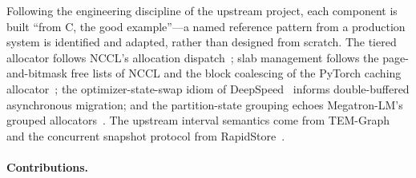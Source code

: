 \documentclass[10pt]{article}
\theoremstyle{definition}
\begin{document}
Following the engineering discipline of the upstream project, each component is
built ``from C, the good example''---a named reference pattern from a
production system is identified and adapted, rather than designed from
scratch. The tiered allocator follows NCCL's allocation dispatch~\citep{nccl};
slab management follows the page-and-bitmask free lists of NCCL and the block
coalescing of the PyTorch caching allocator~\citep{paszke2019pytorch}; the
optimizer-state-swap idiom of DeepSpeed~\citep{rasley2020deepspeed} informs
double-buffered asynchronous migration; and the partition-state grouping echoes
Megatron-LM's grouped allocators~\citep{shoeybi2019megatron}. The upstream
interval semantics come from TEM-Graph~\citep{temgraph} and the concurrent
snapshot protocol from RapidStore~\citep{rapidstore}.

\paragraph{Contributions.}
\end{document}
